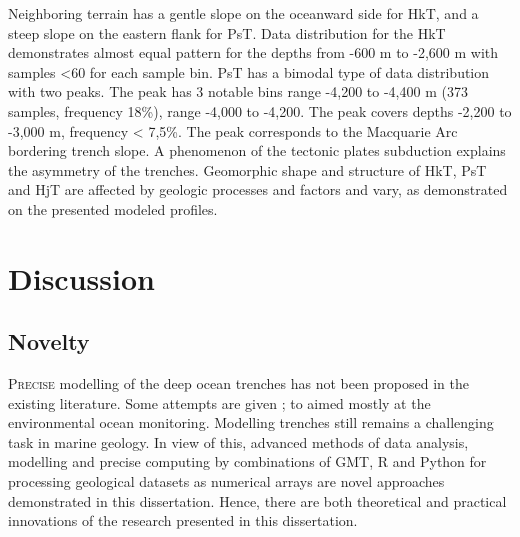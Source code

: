 \documentclass[11pt,a4paper]{report}
\begin{document}
{Neighboring terrain has a gentle slope on the oceanward side for HkT, and a steep slope on the eastern flank for \ac{PsT}. Data distribution for the HkT demonstrates almost equal pattern for the depths from -600 m to -2,600 m with samples <60 for each sample bin. \ac{PsT} has a bimodal type of data distribution with two peaks. The  peak has 3 notable bins range -4,200 to -4,400 m (373 samples, frequency 18\%), range -4,000 to -4,200. The  peak covers depths -2,200 to -3,000 m, frequency < 7,5\%. The peak corresponds to the Macquarie Arc bordering trench slope. A phenomenon of the tectonic plates subduction explains the asymmetry of the trenches. Geomorphic shape and structure of HkT, \ac{PsT} and HjT are affected by geologic processes and factors and vary, as demonstrated on the presented modeled profiles.


\pagebreak
\chapter{Discussion}\label{chp:5}

\section{Novelty}
\lettrine[lines=3]{\color{DeepPink4}P}{recise} modelling of the deep ocean trenches has not been proposed in the existing literature. Some attempts are given \cite{Pollnacetal2001}; \cite{WrightRothery1998} to aimed mostly at the environmental ocean monitoring. Modelling trenches still remains a challenging task in marine geology. In view of this, advanced methods of data analysis, modelling and precise computing by combinations of \ac{GMT}, R and Python for processing geological datasets as numerical arrays are novel approaches demonstrated in this dissertation. Hence, there are both theoretical and practical innovations of the research presented in this dissertation. 

}
\end{document}
